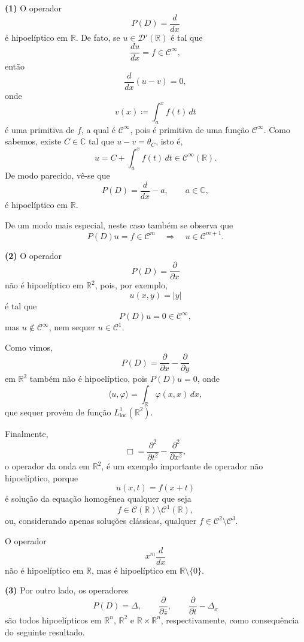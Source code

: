 \documentclass[../distribution_theory_notes.tex]{subfiles}
\begin{document}
\begin{example}
	\medskip
	\noindent\textbf{(1)} O operador
	\[
		P(D)=\frac{d}{dx}
	\]
	é hipoelíptico em \(\mathbb{R}\). De fato, se \(u\in\mathcal{D}'(\mathbb{R})\) é tal que
	\[
		\frac{du}{dx}=f\in\mathcal{C}^{\infty},
	\]
	então
	\[
		\frac{d}{dx}(u-v)=0,
	\]
	onde
	\[
		v(x)\coloneqq\int_{a}^{x}f(t)\,dt
	\]
	é uma primitiva de \(f\), a qual é \(\mathcal{C}^{\infty}\), pois é primitiva de uma função \(\mathcal{C}^{\infty}\). Como sabemos, existe \(C\in\mathbb{C}\) tal que \(u-v=\theta_{C}\), isto é,
	\[
		u=C+\int_{a}^{x}f(t)\,dt\in\mathcal{C}^{\infty}(\mathbb{R}).
	\]
	De modo parecido, vê-se que
	\[
		P(D)=\frac{d}{dx}-a,
		\qquad a\in\mathbb{C},
	\]
	é hipoelíptico em \(\mathbb{R}\).

	De um modo mais especial, neste caso também se observa que
	\[
		P(D)u=f\in\mathcal{C}^{m}
		\quad\Longrightarrow\quad
		u\in\mathcal{C}^{m+1}.
	\]

	\medskip
	\noindent\textbf{(2)} O operador
	\[
		P(D)=\frac{\partial}{\partial x}
	\]
	não é hipoelíptico em \(\mathbb{R}^{2}\), pois, por exemplo,
	\[
		u(x,y)=|y|
	\]
	é tal que
	\[
		P(D)u=0\in\mathcal{C}^{\infty},
	\]
	mas \(u\notin\mathcal{C}^{\infty}\), nem sequer \(u\in\mathcal{C}^{1}\).

	Como vimos,
	\[
		P(D)=\frac{\partial}{\partial x}-\frac{\partial}{\partial y}
	\]
	em \(\mathbb{R}^{2}\) também não é hipoelíptico, pois \(P(D)u=0\), onde
	\[
		\langle u,\varphi\rangle
		=\int_{\mathbb{R}}\varphi(x,x)\,dx,
	\]
	que sequer provém de função \(L_{\mathrm{loc}}^{1}(\mathbb{R}^{2})\).

	Finalmente,
	\[
		\Box=\frac{\partial^{2}}{\partial t^{2}}-\frac{\partial^{2}}{\partial x^{2}},
	\]
	o operador da onda em \(\mathbb{R}^{2}\), é um exemplo importante de operador não hipoelíptico, porque
	\[
		u(x,t)=f(x+t)
	\]
	é solução da equação homogênea qualquer que seja
	\[
		f\in\mathcal{C}(\mathbb{R})\setminus\mathcal{C}^{1}(\mathbb{R}),
	\]
	ou, considerando apenas soluções clássicas, qualquer \(f\in\mathcal{C}^{2}\setminus\mathcal{C}^{3}\).
	\begin{exr}
		O operador
		\[
			x^{m}\frac{d}{dx}
		\]
		não é hipoelíptico em \(\mathbb{R}\), mas é hipoelíptico em \(\mathbb{R}\setminus\{0\}\).
	\end{exr}

	\medskip
	\noindent\textbf{(3)} Por outro lado, os operadores
	\[
		P(D)=\Delta,
		\qquad \frac{\partial}{\partial\overline{z}},
		\qquad \frac{\partial}{\partial t}-\Delta_{x}
	\]
	são todos hipoelípticos em \(\mathbb{R}^{n}\), \(\mathbb{R}^{2}\) e \(\mathbb{R}\times\mathbb{R}^{n}\), respectivamente, como consequência do seguinte resultado.
\end{example}
\end{document}
